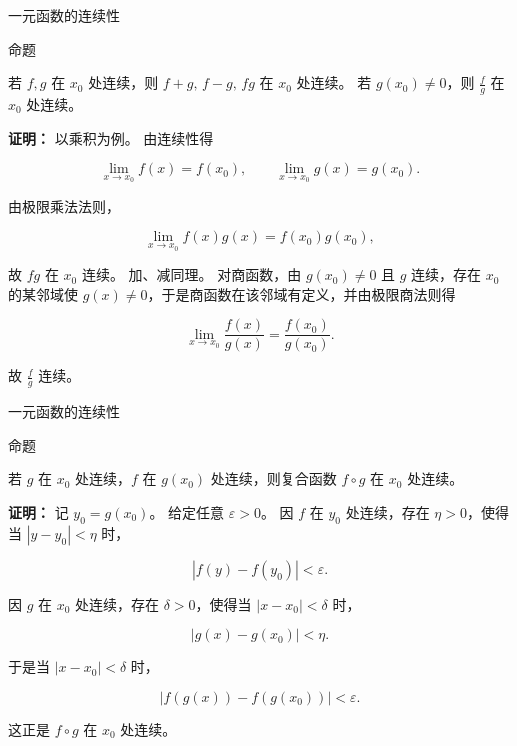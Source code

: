 \documentclass[aspectratio=169,10pt,fontset=fandol]{ctexbeamer}
\begin{document}
\begin{frame}[t,fragile]{一元函数的连续性}
\normalsize
\begin{block}{命题}
{\normalsize


若 $f,g$ 在 $x_0$ 处连续，则 $f+g,\,f-g,\,fg$ 在 $x_0$ 处连续。 若 $g(x_0)\neq0$，则 $\frac{f}{g}$ 在 $x_0$ 处连续。


}
\end{block}
\pause
{\normalsize
\textbf{证明：}
以乘积为例。 由连续性得

\[

\lim_{x\to x_0}f(x)=f(x_0),\qquad \lim_{x\to x_0}g(x)=g(x_0).

\]

由极限乘法法则，

\[

\lim_{x\to x_0}f(x)g(x)=f(x_0)g(x_0),

\]

故 $fg$ 在 $x_0$ 连续。 加、减同理。 对商函数，由 $g(x_0)\neq0$ 且 $g$ 连续，存在 $x_0$ 的某邻域使 $g(x)\neq0$，于是商函数在该邻域有定义，并由极限商法则得

\[

\lim_{x\to x_0}\frac{f(x)}{g(x)}=\frac{f(x_0)}{g(x_0)}.

\]

故 $\frac{f}{g}$ 连续。


}
\end{frame}
\begin{frame}[t,fragile]{一元函数的连续性}
\normalsize
\begin{block}{命题}
{\normalsize


若 $g$ 在 $x_0$ 处连续，$f$ 在 $g(x_0)$ 处连续，则复合函数 $f\circ g$ 在 $x_0$ 处连续。


}
\end{block}
\pause
{\normalsize
\textbf{证明：}
记 $y_0=g(x_0)$。 给定任意 $\varepsilon>0$。 因 $f$ 在 $y_0$ 处连续，存在 $\eta>0$，使得当 $|y-y_0|<\eta$ 时，

\[

|f(y)-f(y_0)|<\varepsilon.

\]

因 $g$ 在 $x_0$ 处连续，存在 $\delta>0$，使得当 $|x-x_0|<\delta$ 时，

\[

|g(x)-g(x_0)|<\eta.

\]

于是当 $|x-x_0|<\delta$ 时，

\[

|f(g(x))-f(g(x_0))|<\varepsilon.

\]

这正是 $f\circ g$ 在 $x_0$ 处连续。


}
\end{frame}
\end{document}
